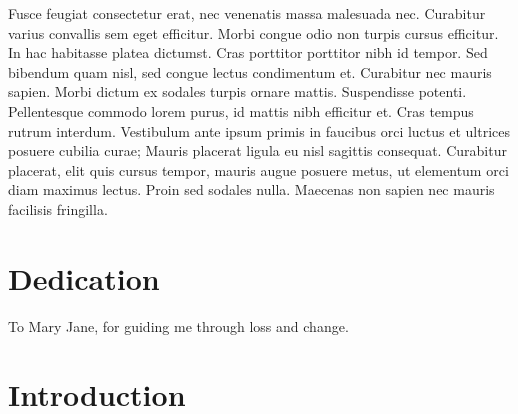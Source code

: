 \documentclass[
]{article}
\begin{document}
Fusce feugiat consectetur erat, nec venenatis massa malesuada nec. Curabitur varius convallis sem eget efficitur. Morbi congue odio non turpis cursus efficitur. In hac habitasse platea dictumst. Cras porttitor porttitor nibh id tempor. Sed bibendum quam nisl, sed congue lectus condimentum et. Curabitur nec mauris sapien. Morbi dictum ex sodales turpis ornare mattis. Suspendisse potenti. Pellentesque commodo lorem purus, id mattis nibh efficitur et. Cras tempus rutrum interdum. Vestibulum ante ipsum primis in faucibus orci luctus et ultrices posuere cubilia curae; Mauris placerat ligula eu nisl sagittis consequat. Curabitur placerat, elit quis cursus tempor, mauris augue posuere metus, ut elementum orci diam maximus lectus. Proin sed sodales nulla. Maecenas non sapien nec mauris facilisis fringilla.

\clearpage

\section*{Dedication}

\begin{center}
    \vspace*{\fill}
    To Mary Jane, for guiding me through loss and change.
    \vspace*{\fill}
\end{center}

\clearpage

\section{Introduction}\label{introduction}


\renewcommand{\thefigure}{1.\arabic{figure}}
\setcounter{figure}{0}
\renewcommand{\thetable}{1.\arabic{table}}
\setcounter{table}{0}
\renewcommand{\theequation}{1.\arabic{equation}}
\setcounter{equation}{0}
\end{document}
